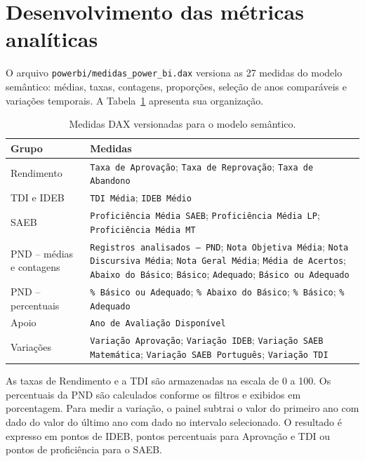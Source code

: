 \section{Desenvolvimento das métricas analíticas}

O arquivo \texttt{powerbi/medidas\_power\_bi.dax} versiona as 27 medidas do modelo semântico: médias, taxas, contagens, proporções, seleção de anos comparáveis e variações temporais. A Tabela~\ref{tab:medidas-dax} apresenta sua organização.

\begin{table}[H]
\centering
\scriptsize
\caption{Medidas DAX versionadas para o modelo semântico.}
\label{tab:medidas-dax}
\renewcommand{\arraystretch}{1.2}
\begin{tabular}{|p{3.0cm}|p{10.0cm}|}
\hline
\textbf{Grupo} & \textbf{Medidas} \\ \hline
Rendimento & \texttt{Taxa de Aprovação}; \texttt{Taxa de Reprovação}; \texttt{Taxa de Abandono} \\ \hline
TDI e IDEB & \texttt{TDI Média}; \texttt{IDEB Médio} \\ \hline
SAEB & \texttt{Proficiência Média SAEB}; \texttt{Proficiência Média LP}; \texttt{Proficiência Média MT} \\ \hline
PND -- médias e contagens & \texttt{Registros analisados — PND}; \texttt{Nota Objetiva Média}; \texttt{Nota Discursiva Média}; \texttt{Nota Geral Média}; \texttt{Média de Acertos}; \texttt{Abaixo do Básico}; \texttt{Básico}; \texttt{Adequado}; \texttt{Básico ou Adequado} \\ \hline
PND -- percentuais & \texttt{\% Básico ou Adequado}; \texttt{\% Abaixo do Básico}; \texttt{\% Básico}; \texttt{\% Adequado} \\ \hline
Apoio & \texttt{Ano de Avaliação Disponível} \\ \hline
Variações & \texttt{Variação Aprovação}; \texttt{Variação IDEB}; \texttt{Variação SAEB Matemática}; \texttt{Variação SAEB Português}; \texttt{Variação TDI} \\ \hline
\end{tabular}
\end{table}

As taxas de Rendimento e a TDI são armazenadas na escala de 0 a 100. Os percentuais da PND são calculados conforme os filtros e exibidos em porcentagem. Para medir a variação, o painel subtrai o valor do primeiro ano com dado do valor do último ano com dado no intervalo selecionado. O resultado é expresso em pontos de IDEB, pontos percentuais para Aprovação e TDI ou pontos de proficiência para o SAEB.

